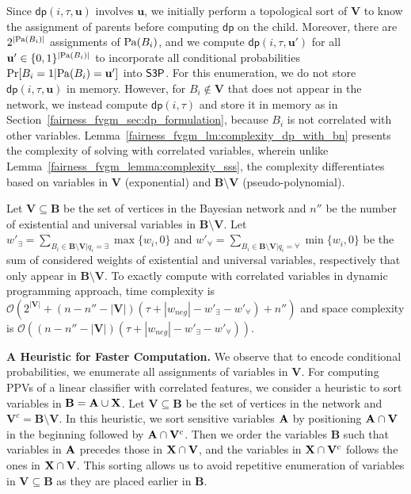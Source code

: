 Since $ \mathsf{dp}(i, \tau, \mathbf{u}) $ involves  $ \mathbf{u} $, we initially perform a topological sort of $ \mathbf{V} $ to know the assignment of parents before computing $ \mathsf{dp} $ on the child. Moreover, there are $ 2^{|\mathrm{Pa}(B_i)|} $ assignments of $ \mathrm{Pa}(B_i) $, and we compute $ \mathsf{dp}(i, \tau, \mathbf{u}') $ for all $ \mathbf{u}' \in \{0,1\}^{|\mathrm{Pa}(B_i)|} $ to incorporate all conditional probabilities $ \Pr[B_i = 1|\mathrm{Pa}(B_i) = \mathbf{u}'] $ into $ \mathsf{S3P} $.  For this enumeration, we do not store $ \mathsf{dp}(i, \tau, \mathbf{u}) $ in memory. However, for $ B_i \not \in \mathbf{V} $ that does not appear in the network, we instead compute $ \mathsf{dp}(i, \tau) $ and store it in memory as in Section~\ref{fairness_fvgm_sec:dp_formulation}, because $ B_i $ is not correlated with other variables.  Lemma~\ref{fairness_fvgm_lm:complexity_dp_with_bn} presents the complexity of solving {\stochastic} with correlated variables, wherein unlike Lemma~\ref{fairness_fvgm_lemma:complexity_sss}, the  complexity differentiates based on variables in $ \mathbf{V} $ (exponential) and $ \mathbf{B}\setminus \mathbf{V} $ (pseudo-polynomial). 


\begin{lemma}
	\label{fairness_fvgm_lm:complexity_dp_with_bn}
	Let $ \mathbf{V} \subseteq \mathbf{B} $ be the set of vertices in the Bayesian network and $ n'' $ be the number of existential and universal variables in $ \mathbf{B} \setminus \mathbf{V} $. Let $ w'_{\exists} = \sum_{B_i \in \mathbf{B} \setminus \mathbf{V} | q_i = \exists} \max\{w_i, 0\}$  and $ w'_{\forall} = \sum_{B_i \in \mathbf{B} \setminus \mathbf{V} | q_i = \forall} \min\{w_i, 0\}$ be the sum of considered weights of existential and universal variables, respectively that only appear in $ \mathbf{B} \setminus \mathbf{V} $. To exactly compute {\stochastic} with correlated variables in dynamic programming approach,  time complexity is $ \mathcal{O}(2^{|\mathbf{V}|} + (n - n'' - |\mathbf{V}|)(\tau + |w_{neg}| - w'_{\exists} - w'_{\forall}) + n'') $ and space complexity is $ \mathcal{O}((n - n'' - |\mathbf{V}|)(\tau + |w_{neg}| - w'_{\exists} - w'_{\forall})) $.
\end{lemma}	

\textbf{A Heuristic for Faster Computation.} We observe that to encode conditional probabilities, we enumerate all assignments of variables in $ \mathbf{V} $. For computing PPVs of a linear classifier with correlated features, we consider a heuristic to sort variables in $ \mathbf{B} = \mathbf{A} \cup \mathbf{X} $. Let $ \mathbf{V} \subseteq \mathbf{B} $ be the set of vertices in the network and $ \mathbf{V}^c = \mathbf{B} \setminus \mathbf{V} $. In this heuristic, we sort sensitive variables $ \mathbf{A} $ by positioning $ \mathbf{A} \cap \mathbf{V} $ in the beginning followed by $ \mathbf{A} \cap \mathbf{V}^c $. Then we order the variables $ \mathbf{B} $ such that variables in $ \mathbf{A} $ precedes those in $ \mathbf{X} \cap \mathbf{V} $, and the variables in $ \mathbf{X} \cap \mathbf{V}^c $ follows the ones in $ \mathbf{X} \cap \mathbf{V} $. This sorting allows us to avoid repetitive enumeration of variables in $ \mathbf{V} \subseteq \mathbf{B} $ as they are placed earlier in $ \mathbf{B} $.


